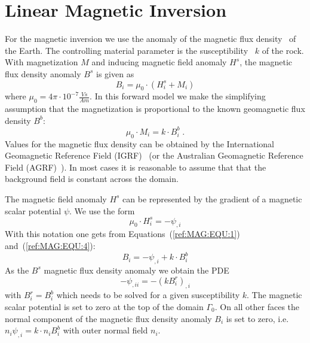 
%
%
%


\section{Linear Magnetic Inversion}\label{sec:forward magnetic}
For the magnetic inversion we use the anomaly of the magnetic flux
density~ of the Earth.
The controlling material parameter is the susceptibility~
$k$ of the rock.
With magnetization $M$ and inducing magnetic field anomaly $H^s$, the magnetic
flux density anomaly $B^s$ is given as
\begin{equation}\label{ref:MAG:EQU:1}
B_i = \mu_0 \cdot ( H^s_i  + M_i )
\end{equation}
where $\mu_0 = 4 \pi \cdot 10^{-7} \frac{Vs}{Am}$.
In this forward model we make the simplifying assumption that the magnetization
is proportional to the known geomagnetic flux density $B^b$:
\begin{equation}\label{ref:MAG:EQU:4}
\mu_0  \cdot M_i = k \cdot B^b_i \;. 
\end{equation}
Values for the magnetic flux density can be obtained by the International
Geomagnetic Reference Field (IGRF)~\cite{IGRF}
(or the Australian Geomagnetic Reference Field (AGRF)~\cite{AGRF}).
In most cases it is reasonable to assume that that the background field is
constant across the domain.

The magnetic field anomaly $H^s$ can be represented by the gradient of a
magnetic scalar potential $\psi$.
We use the form 
\begin{equation}\label{ref:MAG:EQU:6}
\mu_0  \cdot H^s_i = - \psi_{,i}
\end{equation}
With this notation one gets from Equations~(\ref{ref:MAG:EQU:1}) and~(\ref{ref:MAG:EQU:4}):
\begin{equation}\label{ref:MAG:EQU:7}
B_i = - \psi_{,i}  + k \cdot B^b_i
\end{equation}
As the $B^s$ magnetic flux density anomaly we obtain the PDE
\begin{equation}\label{ref:MAG:EQU:8}
- \psi_{,ii} = - (k B^r_i)_{,i} 
\end{equation} 
with $B^r_i=B^b_i$ which needs to be solved for a given susceptibility $k$.
The magnetic scalar potential is set to zero at the top of the domain
$\Gamma_{0}$.
On all other faces the normal component of the magnetic flux density anomaly
$B_i$ is set to zero, i.e. $n_i \psi_{,i} = k \cdot n_i  B^b_i$ with outer
normal field $n_i$.

